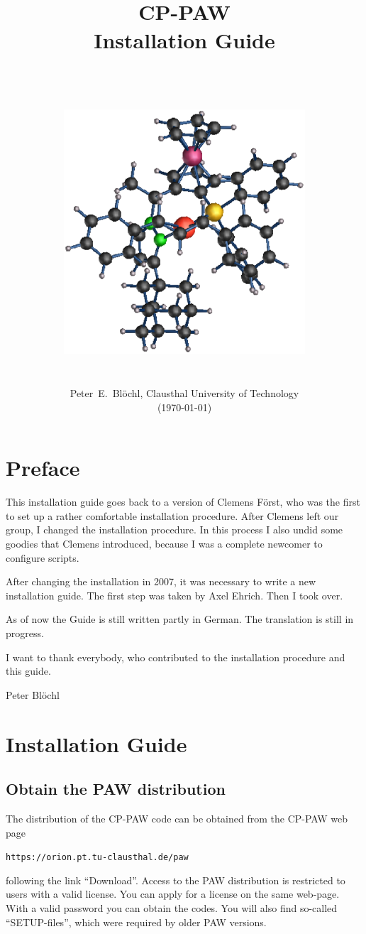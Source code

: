 \documentclass[a4paper,10pt]{report}
\title{{\bfseries\Huge
\hrulefill\\
\hrulefill CP-PAW\hrulefill\\
\hrulefill Installation Guide\hrulefill\\
\hrulefill\\}
\hfill\\
\includegraphics[width=9cm]{Figs/big.eps}
}
\date{\hrulefill\\Peter~E.~Bl\"ochl, Clausthal University of Technology\\(\today)}
\newcommand{\mytt}[1]{{\tt #1}}
\begin{document}
\maketitle
\tableofcontents

\chapter{Preface}
This installation guide goes back to a version of Clemens F\"orst, who
was the first to set up a rather comfortable installation procedure.
After Clemens left our group, I changed the installation procedure. In
this process I also undid some goodies that Clemens introduced,
because I was a complete newcomer to configure scripts.

After changing the installation in 2007, it was necessary to write a
new installation guide. The first step was taken by Axel Ehrich. Then
I took over.

As of now the Guide is still written partly in German. The translation
is still in progress.

I want to thank everybody, who contributed to the installation
procedure and this guide.

Peter Bl\"ochl

\chapter{Installation Guide}
\label{sec:vollstinst}

\section{Obtain the PAW distribution}
The distribution of the CP-PAW code can be obtained from the CP-PAW
web page
\begin{center}
\mytt{https://orion.pt.tu-clausthal.de/paw}
\end{center}
following the link ``Download''. Access to the PAW distribution is
restricted to users with a valid license. You can apply for a license
on the same web-page. With a valid password you can obtain the codes.
You will also find so-called ``SETUP-files'', which
were required by older PAW versions.
\end{document}
